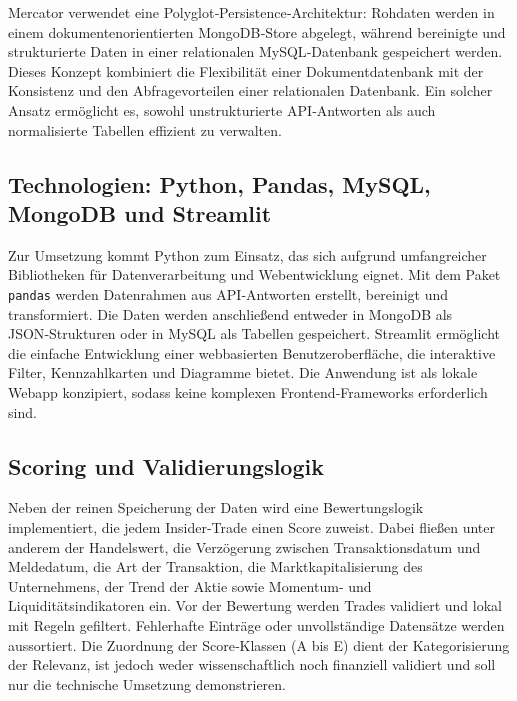 Mercator verwendet eine Polyglot‑Persistence‑Architektur: Rohdaten werden in einem dokumentenorientierten MongoDB‑Store abgelegt, während bereinigte und strukturierte Daten in einer relationalen MySQL‑Datenbank gespeichert werden. Dieses Konzept kombiniert die Flexibilität einer Dokumentdatenbank mit der Konsistenz und den Abfragevorteilen einer relationalen Datenbank. Ein solcher Ansatz ermöglicht es, sowohl unstrukturierte API‑Antworten als auch normalisierte Tabellen effizient zu verwalten.

\subsection{Technologien: Python, Pandas, MySQL, MongoDB und Streamlit}

Zur Umsetzung kommt Python zum Einsatz, das sich aufgrund umfangreicher Bibliotheken für Datenverarbeitung und Webentwicklung eignet. Mit dem Paket \texttt{pandas} werden Datenrahmen aus API‑Antworten erstellt, bereinigt und transformiert. Die Daten werden anschließend entweder in MongoDB als JSON‑Strukturen oder in MySQL als Tabellen gespeichert. Streamlit ermöglicht die einfache Entwicklung einer webbasierten Benutzeroberfläche, die interaktive Filter, Kennzahlkarten und Diagramme bietet. Die Anwendung ist als lokale Webapp konzipiert, sodass keine komplexen Frontend‑Frameworks erforderlich sind.

\subsection{Scoring und Validierungslogik}

Neben der reinen Speicherung der Daten wird eine Bewertungslogik implementiert, die jedem Insider‑Trade einen Score zuweist. Dabei fließen unter anderem der Handelswert, die Verzögerung zwischen Transaktionsdatum und Meldedatum, die Art der Transaktion, die Marktkapitalisierung des Unternehmens, der Trend der Aktie sowie Momentum‑ und Liquiditätsindikatoren ein. Vor der Bewertung werden Trades validiert und lokal mit Regeln gefiltert. Fehlerhafte Einträge oder unvollständige Datensätze werden aussortiert. Die Zuordnung der Score‑Klassen (A bis E) dient der Kategorisierung der Relevanz, ist jedoch weder wissenschaftlich noch finanziell validiert und soll nur die technische Umsetzung demonstrieren.